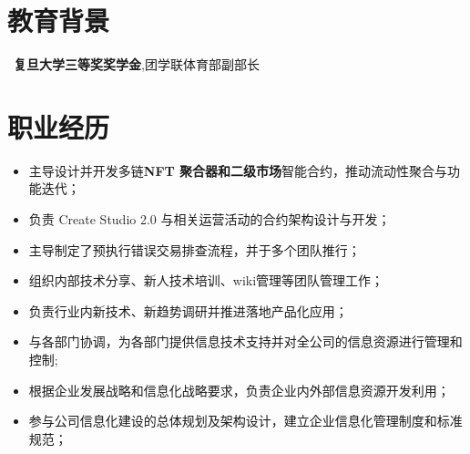 \documentclass{resume}
\begin{document}




\section{教育背景}
\ \textbf{复旦大学三等奖奖学金},团学联体育部副部长

\section{职业经历}

\begin{itemize}[parsep=0.5ex]
  \item 主导设计并开发多链\textbf{NFT 聚合器和二级市场}智能合约，推动流动性聚合与功能迭代；
  \item 负责 Create Studio 2.0 与相关运营活动的合约架构设计与开发；
  \item 主导制定了预执行错误交易排查流程，并于多个团队推行；
  \item 组织内部技术分享、新人技术培训、wiki管理等团队管理工作；
  \item 负责行业内新技术、新趋势调研并推进落地产品化应用；
\end{itemize}

\begin{itemize}[parsep=0.5ex]
  \item 与各部门协调，为各部门提供信息技术支持并对全公司的信息资源进行管理和控制;
  \item 根据企业发展战略和信息化战略要求，负责企业内外部信息资源开发利用；
  \item 参与公司信息化建设的总体规划及架构设计，建立企业信息化管理制度和标准规范；
\end{itemize}
\end{document}
